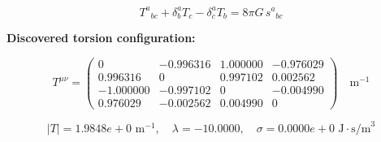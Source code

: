 
\begin{equation}
  T^a{}_{bc} + \delta^a_b T_c - \delta^a_c T_b = 8\pi G \, s^a{}_{bc}
\end{equation}

\textbf{Discovered torsion configuration:}

\begin{equation}
  T^{\mu\nu} = \begin{pmatrix}
    0 & -0.996316 & 1.000000 & -0.976029 \\
    0.996316 & 0 & 0.997102 & 0.002562 \\
    -1.000000 & -0.997102 & 0 & -0.004990 \\
    0.976029 & -0.002562 & 0.004990 & 0
  \end{pmatrix} \quad \text{m}^{-1}
\end{equation}

\begin{equation}
  |T| = 1.9848e+0 \text{ m}^{-1}, \quad
  \lambda = -10.0000, \quad
  \sigma = 0.0000e+0 \text{ J}\cdot\text{s/m}^3
\end{equation}